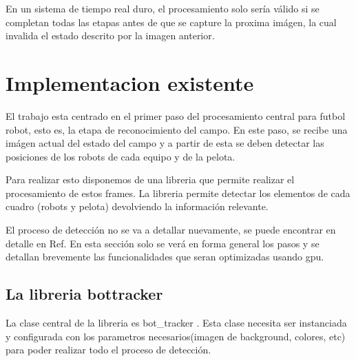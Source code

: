 \documentclass[a4paper,10pt]{report}
\begin{document}
En un sistema de tiempo real duro, el procesamiento solo sería válido si se completan todas las etapas antes de que se capture la proxima imágen, la cual invalida el estado descrito por la imagen anterior.

\section{Implementacion existente}

El trabajo esta centrado en el primer paso del procesamiento central para futbol robot, esto es, la etapa de reconocimiento del campo. 
En este paso, se recibe una imágen actual del estado del campo y a partir de esta se deben detectar las posiciones de los robots de cada equipo y de la pelota.


Para realizar esto disponemos de una libreria que permite realizar el procesamiento de estos frames. 
La libreria permite detectar los elementos de cada cuadro (robots y pelota) devolviendo la información relevante. 

El proceso de detección no se va a detallar nuevamente, se puede encontrar en detalle en Ref. \cite[capitulo 5]{Jaureguiberry}
En esta sección solo se verá en forma general los pasos y se detallan brevemente las funcionalidades que seran optimizadas usando gpu.


\subsection{La libreria bottracker}

La clase central de la libreria es bot\_tracker \cite[]{Jaureguiberry}. Esta clase necesita ser instanciada y configurada con los parametros necesarios(imagen de background, colores, etc) para poder realizar todo el proceso de detección.
\end{document}
